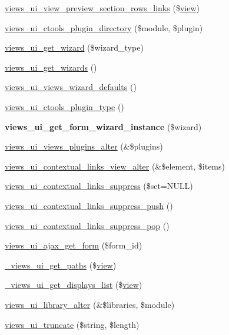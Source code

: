 \begin{DoxyCompactItemize}
\item 
\hyperlink{views__ui_8module_acb8a2378590d1fc1bd5ac11accc95d73}{views\_\-ui\_\-view\_\-preview\_\-section\_\-rows\_\-links} (\$\hyperlink{classview}{view})
\item 
\hyperlink{views__ui_8module_abc525dd2fcbb81c7499c9df4828e902b}{views\_\-ui\_\-ctools\_\-plugin\_\-directory} (\$module, \$plugin)
\item 
\hyperlink{views__ui_8module_ab8339e2a64a4fe940e2362faeccf38cc}{views\_\-ui\_\-get\_\-wizard} (\$wizard\_\-type)
\item 
\hyperlink{views__ui_8module_af69a11591c46afd75a4e113dad9673f4}{views\_\-ui\_\-get\_\-wizards} ()
\item 
\hyperlink{views__ui_8module_a613f09404d3477163eee3f775c0abcbc}{views\_\-ui\_\-views\_\-wizard\_\-defaults} ()
\item 
\hyperlink{views__ui_8module_ae2a131b1e4c36d0e2777642eda6d78b0}{views\_\-ui\_\-ctools\_\-plugin\_\-type} ()
\item 
\hypertarget{views__ui_8module_a32c562595f3d4c9d2ae73819bf435c9b}{
{\bfseries views\_\-ui\_\-get\_\-form\_\-wizard\_\-instance} (\$wizard)}
\label{views__ui_8module_a32c562595f3d4c9d2ae73819bf435c9b}

\item 
\hyperlink{views__ui_8module_a30510f1634492251ad7821713cb8c052}{views\_\-ui\_\-views\_\-plugins\_\-alter} (\&\$plugins)
\item 
\hyperlink{views__ui_8module_a5b9dd769ef8a18413dcf7b3342779947}{views\_\-ui\_\-contextual\_\-links\_\-view\_\-alter} (\&\$element, \$items)
\item 
\hyperlink{views__ui_8module_a5260e8015954411b641445a3389dd5ce}{views\_\-ui\_\-contextual\_\-links\_\-suppress} (\$set=NULL)
\item 
\hyperlink{views__ui_8module_a7532104e55cf66b4dbadfd526bae61e3}{views\_\-ui\_\-contextual\_\-links\_\-suppress\_\-push} ()
\item 
\hyperlink{views__ui_8module_ab6dfabb5c82c088831c6ef269c39b4db}{views\_\-ui\_\-contextual\_\-links\_\-suppress\_\-pop} ()
\item 
\hyperlink{views__ui_8module_a869b55ec9965e41d8498ff9269b652b7}{views\_\-ui\_\-ajax\_\-get\_\-form} (\$form\_\-id)
\item 
\hyperlink{views__ui_8module_a4ed6fe4d3b9596fd2315fdbe5b44ef04}{\_\-views\_\-ui\_\-get\_\-paths} (\$\hyperlink{classview}{view})
\item 
\hyperlink{views__ui_8module_a7555ff14cf011bd02f883285154625e7}{\_\-views\_\-ui\_\-get\_\-displays\_\-list} (\$\hyperlink{classview}{view})
\item 
\hyperlink{views__ui_8module_a8d1ae20c472021c362af79c2eb86f0f8}{views\_\-ui\_\-library\_\-alter} (\&\$libraries, \$module)
\item 
\hyperlink{views__ui_8module_a83deaf433f66036af4dd3363c52a936e}{views\_\-ui\_\-truncate} (\$string, \$length)
\end{DoxyCompactItemize}


